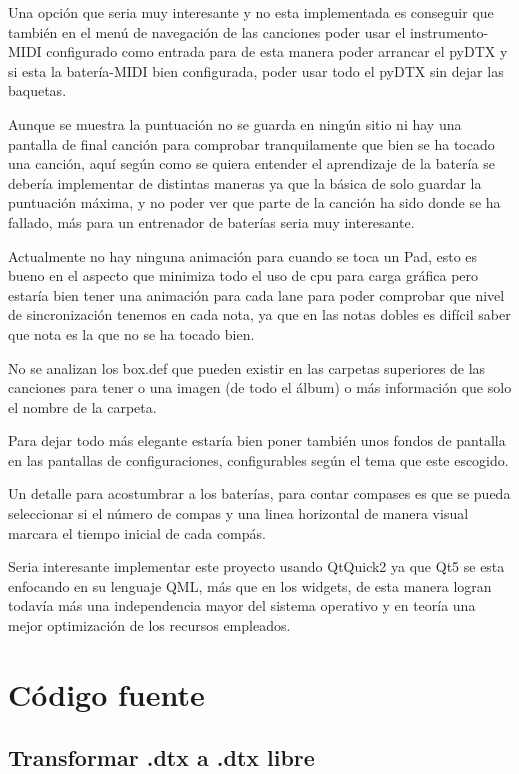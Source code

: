 \documentclass[a4paper,11pt,oneside]{book}
\begin{document}
Una opción que seria muy interesante y no esta implementada es conseguir que también en el menú de navegación de las canciones poder usar el instrumento-MIDI configurado como entrada para de esta manera poder arrancar el pyDTX y si esta la batería-MIDI bien configurada, poder usar todo el pyDTX sin dejar las baquetas.

Aunque se muestra la puntuación no se guarda en ningún sitio ni hay una pantalla de final canción para comprobar tranquilamente que bien se ha tocado una canción, aquí según como se quiera entender el aprendizaje de la batería se debería implementar de distintas maneras ya que la básica de solo guardar la puntuación máxima, y no poder ver que parte de la canción ha sido donde se ha fallado, más para un entrenador de baterías seria muy interesante.

Actualmente no hay ninguna animación para cuando se toca un Pad, esto es bueno en el aspecto que minimiza todo el uso de cpu para carga gráfica pero estaría bien tener una animación para cada lane para poder comprobar que nivel de sincronización tenemos en cada nota, ya que en las notas dobles es difícil saber que nota es la que no se ha tocado bien.

No se analizan los box.def que pueden existir en las carpetas superiores de las canciones para tener o una imagen (de todo el álbum) o más información que solo el nombre de la carpeta.

Para dejar todo más elegante estaría bien poner también unos fondos de pantalla en las pantallas de configuraciones, configurables según el tema que este escogido.

Un detalle para acostumbrar a los baterías, para contar compases es que se pueda seleccionar si el número de compas y una linea horizontal de manera visual marcara el tiempo inicial de cada compás. 

Seria interesante implementar este proyecto usando QtQuick2 ya que Qt5 se esta enfocando en su lenguaje QML, más que en los widgets, de esta manera logran todavía más una independencia mayor del sistema operativo y en teoría una mejor optimización de los recursos empleados.

\appendix


\chapter{Código fuente}
\section{Transformar .dtx a .dtx libre}
\end{document}
